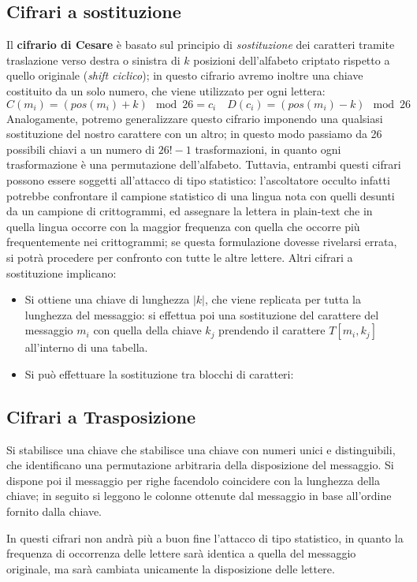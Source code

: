 \subsection{Cifrari a sostituzione}
Il \textbf{cifrario di Cesare} è basato sul principio di \textit{sostituzione} dei caratteri
tramite traslazione verso destra o sinistra di $k$ posizioni dell'alfabeto
criptato rispetto a quello originale (\textit{shift ciclico}); in questo cifrario
avremo inoltre una chiave costituito da un solo numero, che viene utilizzato
per ogni lettera:
\[C(m_i)=(pos(m_i)+k)\mod 26=c_i\quad D(c_i)=(pos(m_i)-k)\mod 26\]
Analogamente, potremo generalizzare questo cifrario imponendo una qualsiasi
sostituzione del nostro carattere con un altro; in questo modo passiamo da
26 possibili chiavi a un numero di $26!-1$ trasformazioni, in quanto ogni 
trasformazione è una permutazione dell'alfabeto. Tuttavia, entrambi questi
cifrari possono essere soggetti all'attacco di tipo statistico: l'ascoltatore
occulto infatti potrebbe confrontare il campione statistico di una lingua nota
con quelli desunti da un campione di crittogrammi, ed assegnare la lettera
in plain-text che in quella lingua occorre con la maggior frequenza con quella
che occorre più frequentemente nei crittogrammi; se questa formulazione dovesse
rivelarsi errata, si potrà procedere per confronto con tutte le altre lettere.
Altri cifrari a sostituzione implicano:
\begin{itemize}
\item Si ottiene una chiave di lunghezza $|k|$, che viene replicata per tutta
	la lunghezza del messaggio: si effettua poi una sostituzione del carattere
	del messaggio $m_i$ con quella della chiave $k_j$ prendendo il 
	carattere $T[m_i,k_j]$ all'interno di una tabella.
\item Si può effettuare la sostituzione tra blocchi di caratteri: 
\end{itemize}

\subsection{Cifrari a Trasposizione}
Si stabilisce una chiave che stabilisce una chiave con numeri unici e 
distinguibili, che identificano una permutazione arbitraria della disposizione
del messaggio. Si dispone poi il messaggio per righe facendolo coincidere con
la lunghezza della chiave; in seguito si leggono le colonne ottenute dal messaggio
in base all'ordine fornito dalla chiave.

In questi cifrari non andrà più a buon fine l'attacco di tipo statistico, in
quanto la frequenza di occorrenza delle lettere sarà identica a quella del
messaggio originale, ma sarà cambiata unicamente la disposizione delle lettere.

